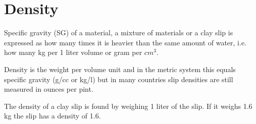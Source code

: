 \chapter{Density}
\label{sec:density}
Specific gravity (SG) of a material, a mixture of materials or a clay slip is 
expressed as how many times it is heavier than the same amount of water, i.e. 
how many kg per 1 liter volume or gram per $cm^3$. 

Density is the weight per volume unit and in the metric system this equals 
specific gravity (g/cc or kg/l) but in many countries slip densities are still 
measured in ounces per pint.

The density of a clay slip is found by weighing 1 liter of the slip. If it 
weighs 1.6 kg the slip has a density of 1.6.
